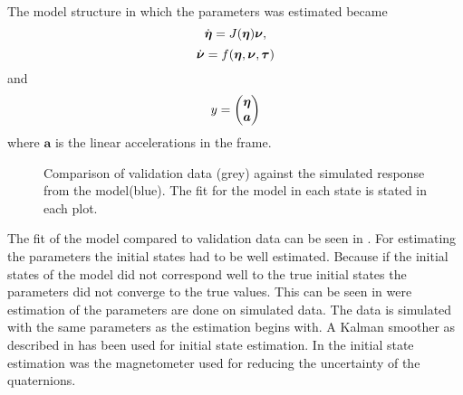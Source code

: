 The model structure in which the parameters was estimated became 
\begin{equation}
\dot{\boldsymbol{\eta}} = J(\boldsymbol{\eta}) \boldsymbol{\nu},
\end{equation}
\begin{equation}
\dot{\boldsymbol{\nu}} =  f(\boldsymbol{\eta}, \boldsymbol{\nu}, \boldsymbol{\tau})
\end{equation}
and
\begin{equation}
y = \begin{pmatrix}
\boldsymbol{\eta} \\
\boldsymbol{a}
\end{pmatrix}
\end{equation}
where $\boldsymbol{a}$ is the linear accelerations in the \abbrROV frame. 
\begin{figure}[tbp]
  \centering
  \qquad
  \qquad
    \qquad
    \qquad
    \qquad
  \caption{\label{fig:angVelCompare}%
    Comparison of validation data (grey) against the simulated response from the model(blue). The fit for the model in each state is stated in each plot.}
\end{figure}
The fit of the model compared to validation data can be seen in . For estimating the parameters the initial states had to be well estimated. Because if the initial states of the model did not correspond well to the true initial states the parameters did not converge to the true values. This can be seen in  were estimation of the parameters are done on simulated data. The data is simulated with the same parameters as the estimation begins with. A Kalman smoother as described in \citet{Wallin} has been used for initial state estimation. In the initial state estimation was the magnetometer used for reducing the uncertainty of the quaternions.

